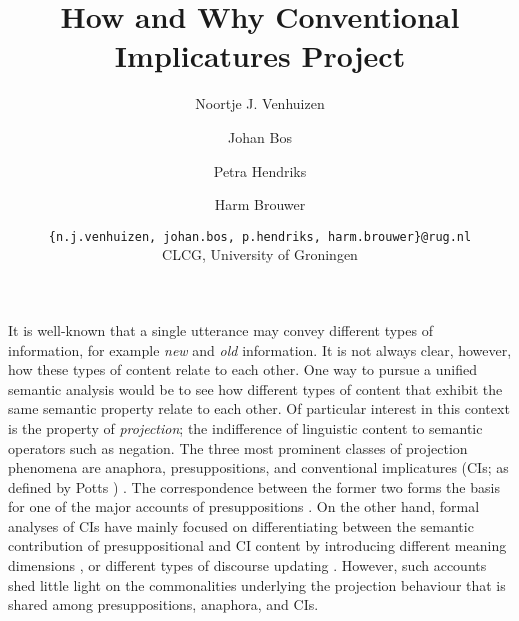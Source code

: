 \documentclass[letterpaper,11pt]{article}
\title{\vspace{-2em} How and Why Conventional Implicatures Project}
\date{}
\author{Noortje J. Venhuizen \and Johan Bos \and Petra Hendriks \and Harm Brouwer \and
  \texttt{\{n.j.venhuizen, johan.bos, p.hendriks, harm.brouwer\}@rug.nl}\\  
CLCG, University of Groningen
\vspace{-2em}}
\begin{document}
\normalsize
\maketitle

\pagestyle{empty}
\thispagestyle{empty}



\noindent 
It is well-known that a single utterance may convey different types of
information, for example \emph{new} and \emph{old} information. It is not
always clear, however, how these types of content relate to each other.
One way to pursue a unified semantic analysis would be to see how different
types of content that exhibit the same semantic property relate to each
other. Of particular interest in this context is the property of
\textit{projection}; the indifference of linguistic content to semantic
operators such as negation. The three most prominent classes of projection
phenomena are anaphora, presuppositions, and conventional implicatures (CIs;
as defined by Potts \cite{potts2005logic}) \cite{simons2010projects}.
The correspondence between the former two forms the basis for one of the
major accounts of presuppositions
\citep{sandt1992presupposition-short,geurts1999presuppositions}. On the
other hand, formal analyses of CIs have mainly focused on differentiating
between the semantic contribution of presuppositional and CI content by
introducing different meaning dimensions
\cite{potts2005logic,nouwen2007appositives-short}, or different types of
discourse updating \citep{anderbois2010crossing}. However, such accounts shed
little light on the commonalities underlying the projection behaviour that
is shared among presuppositions, anaphora, and CIs.
\end{document}
